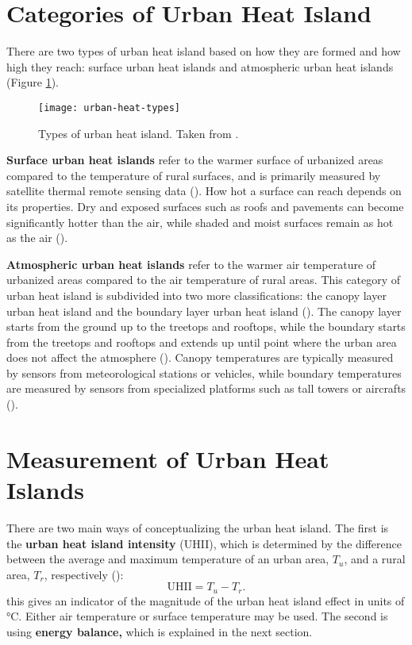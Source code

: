 \section{Categories of Urban Heat Island}
	
	There are two types of urban heat island based on how they are formed and how high they reach:
	surface urban heat islands and atmospheric urban heat islands (Figure \ref{fig:urban-heat-types}).
	
	\begin{figure}
		\centering
		\texttt{[image: urban-heat-types]}
		\caption{Types of urban heat island. Taken from \textcite{Khan2021}.}
		\label{fig:urban-heat-types}
	\end{figure}
	
	\textbf{Surface urban heat islands} refer to the warmer surface of urbanized areas compared to the temperature of rural surfaces, and is primarily measured by satellite thermal remote sensing data (\cite{Zhou2018}). 
	How hot a surface can reach depends on its properties.
	Dry and exposed surfaces such as roofs and pavements can become significantly hotter than the air, while shaded and moist surfaces remain as hot as the air (\cite{Khan2021}). 
	
	\textbf{Atmospheric urban heat islands} refer to the warmer air temperature of urbanized areas compared to the air temperature of rural areas.
	This category of urban heat island is subdivided into two more classifications:
	the canopy layer urban heat island and the boundary layer urban heat island (\cite{Zhou2018}).
	The canopy layer starts from the ground up to the treetops and rooftops, 
	while the boundary starts from the treetops and rooftops and extends up until point where the urban area does not affect the atmosphere (\cite{Khan2021}).
	Canopy temperatures are typically measured by sensors from meteorological stations or vehicles,
	while boundary temperatures are measured by sensors from specialized platforms such as tall towers or aircrafts (\cite{Zhou2018}).

\section{Measurement of Urban Heat Islands}
	There are two main ways of conceptualizing the urban heat island.
	The first is the \textbf{urban heat island intensity} (UHII),
	which is determined by the difference between the average and maximum temperature of an urban area, $T_u$, and a rural area, $T_r$, respectively (\cite{Kim2021}):
	\begin{equation}
		\text{UHII} = T_u - T_r.
	\end{equation}
	this gives an indicator of the magnitude of the urban heat island effect in units of $\unit{\degreeCelsius}$.
	Either air temperature or surface temperature may be used.
	The second is using \textbf{energy balance,} which is explained in the next section.
	
